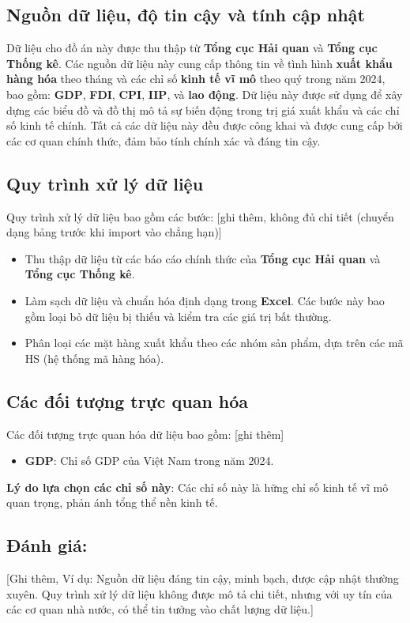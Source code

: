 \documentclass[a4paper]{report}
\begin{document}
{{\subsection{Nguồn dữ liệu, độ tin cậy và tính cập nhật}
Dữ liệu cho đồ án này được thu thập từ \textbf{Tổng cục Hải quan} và \textbf{Tổng cục Thống kê}. Các nguồn dữ liệu này cung cấp thông tin về tình hình \textbf{xuất khẩu hàng hóa} theo tháng và các chỉ số \textbf{kinh tế vĩ mô} theo quý trong năm 2024, bao gồm: \textbf{GDP}, \textbf{FDI}, \textbf{CPI}, \textbf{IIP}, và \textbf{lao động}. Dữ liệu này được sử dụng để xây dựng các biểu đồ và đồ thị mô tả sự biến động trong trị giá xuất khẩu và các chỉ số kinh tế chính. Tất cả các dữ liệu này đều được công khai và được cung cấp bởi các cơ quan chính thức, đảm bảo tính chính xác và đáng tin cậy.

\subsection{Quy trình xử lý dữ liệu}
Quy trình xử lý dữ liệu bao gồm các bước: [ghi thêm, không đủ chi tiết (chuyển dạng bảng trước khi import vào chẳng hạn)]
\begin{itemize}
    \item Thu thập dữ liệu từ các báo cáo chính thức của \textbf{Tổng cục Hải quan} và \textbf{Tổng cục Thống kê}.
    \item Làm sạch dữ liệu và chuẩn hóa định dạng trong \textbf{Excel}. Các bước này bao gồm loại bỏ dữ liệu bị thiếu và kiểm tra các giá trị bất thường.
    \item Phân loại các mặt hàng xuất khẩu theo các nhóm sản phẩm, dựa trên các mã HS (hệ thống mã hàng hóa).
\end{itemize}

\subsection{Các đối tượng trực quan hóa}
Các đối tượng trực quan hóa dữ liệu bao gồm: [ghi thêm]
\begin{itemize}
    \item \textbf{GDP}: Chỉ số GDP của Việt Nam trong năm 2024.
\end{itemize}

\textbf{Lý do lựa chọn các chỉ số này}: Các chỉ số này là hững chỉ số kinh tế vĩ mô quan trọng, phản ánh tổng thể nền kinh tế.

\subsection{Đánh giá:}
[Ghi thêm, Ví dụ:  Nguồn dữ liệu đáng tin cậy, minh bạch, được cập nhật thường xuyên. Quy trình xử lý dữ liệu không được mô tả chi tiết, nhưng với uy tín của các cơ quan nhà nước, có thể tin tưởng vào chất lượng dữ liệu.]


}}
\end{document}
